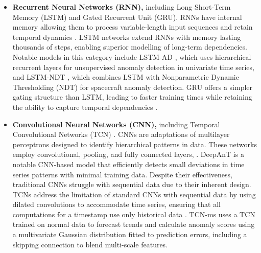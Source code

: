 \documentclass[twoside,11pt,openright]{report}
\begin{document}
\begin{itemize}
    \item \textbf{Recurrent Neural Networks (RNN),} including Long Short-Term Memory (LSTM) 
    and Gated Recurrent Unit (GRU). RNNs have internal memory allowing them to process 
    variable-length input sequences and retain temporal dynamics \citep{darban2024survey}. 
    LSTM networks extend RNNs with memory lasting thousands of steps, enabling superior 
    modelling of long-term dependencies. Notable models in this category include LSTM-AD 
    \citep{malhotra2015lstm}, which uses hierarchical recurrent layers for unsupervised anomaly 
    detection in univariate time series, and LSTM-NDT \citep{hundman2018smap}, which 
    combines LSTM with Nonparametric Dynamic Thresholding (NDT) \citep{hundman2018smap} for spacecraft anomaly detection. 
    GRU \citep{cho2014properties} offers a simpler gating structure than LSTM, leading to faster training times while 
    retaining the ability to capture temporal dependencies \citep{darban2024survey}.

    \item \textbf{Convolutional Neural Networks (CNN),} including Temporal Convolutional 
    Networks (TCN) \citep{bai2018empirical}. CNNs are adaptations of multilayer perceptrons designed to 
    identify hierarchical patterns in data. These
    networks employ convolutional, pooling, and fully connected layers, \citep{darban2024survey}. 
    DeepAnT \citep{munir2018deepant} is a notable CNN-based model that 
    efficiently detects small deviations in time series patterns with minimal training data.
    Despite their effectiveness, traditional CNNs struggle with sequential data due to their inherent
    design.
    TCNs address the 
    limitation of standard CNNs with sequential data by using dilated convolutions to 
    accommodate time series, ensuring that all computations for a timestamp use only 
    historical data \citep{darban2024survey}.
    TCN-ms \citep{he2019temporal} uses a TCN trained on normal data to forecast trends and 
    calculate anomaly scores using a multivariate Gaussian distribution fitted to prediction 
    errors, including a skipping connection to blend multi-scale features.


\end{itemize}
\end{document}
